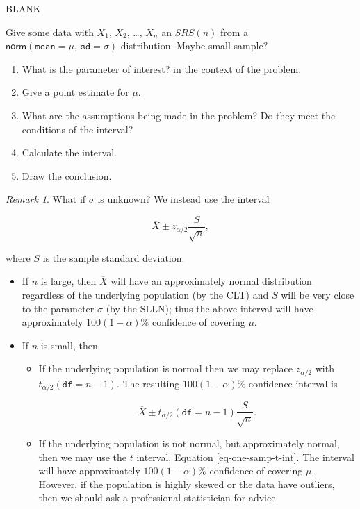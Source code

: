 \documentclass[]{book}
\providecommand{\tightlist}{%
  \setlength{\itemsep}{0pt}\setlength{\parskip}{0pt}}
\numberwithin{equation}{chapter}
\numberwithin{figure}{chapter}
\theoremstyle{plain}
\theoremstyle{definition}
\theoremstyle{remark}
\theoremstyle{definition}
\theoremstyle{definition}
\theoremstyle{remark}
\newtheorem*{remark}{Remark}
\let\BeginKnitrBlock\begin \let\EndKnitrBlock\end
\begin{document}
BLANK

\bigskip

\BeginKnitrBlock{example}
\protect\hypertarget{ex:unnamed-chunk-361}{}{\label{ex:unnamed-chunk-361}}Give
some data with \(X_{1}\), \(X_{2}\), \ldots{}, \(X_{n}\) an \(SRS(n)\)
from a \(\mathsf{norm}(\mathtt{mean}=\mu,\,\mathtt{sd}=\sigma)\)
distribution. Maybe small sample?
\EndKnitrBlock{example}

\begin{enumerate}
\def\labelenumi{\arabic{enumi}.}
\tightlist
\item
  What is the parameter of interest? in the context of the problem.
\item
  Give a point estimate for \(\mu\).
\item
  What are the assumptions being made in the problem? Do they meet the
  conditions of the interval?
\item
  Calculate the interval.
\item
  Draw the conclusion.
\end{enumerate}

\bigskip

\begin{remark}
What if \(\sigma\) is unknown? We instead use the interval

\begin{equation}
\overline{X}\pm z_{\alpha/2}\frac{S}{\sqrt{n}},
\end{equation}

where \(S\) is the sample standard deviation.

\begin{itemize}
\tightlist
\item
  If \(n\) is large, then \(\overline{X}\) will have an approximately
  normal distribution regardless of the underlying population (by the
  CLT) and \(S\) will be very close to the parameter \(\sigma\) (by the
  SLLN); thus the above interval will have approximately
  \(100(1-\alpha)\%\) confidence of covering \(\mu\).
\item
  If \(n\) is small, then

  \begin{itemize}
  \tightlist
  \item
    If the underlying population is normal then we may replace
    \(z_{\alpha/2}\) with \(t_{\alpha/2}(\mathtt{df}=n-1)\). The
    resulting \(100(1-\alpha)\%\) confidence interval is

    \begin{equation}
      \label{eq-one-samp-t-int}
      \overline{X}\pm t_{\alpha/2}(\mathtt{df}=n-1)\frac{S}{\sqrt{n}}.
      \end{equation}
  \item
    If the underlying population is not normal, but approximately
    normal, then we may use the \(t\) interval, Equation
    \eqref{eq-one-samp-t-int}. The interval will have approximately
    \(100(1-\alpha)\%\) confidence of covering \(\mu\). However, if the
    population is highly skewed or the data have outliers, then we
    should ask a professional statistician for advice.
  \end{itemize}
\end{itemize}
\end{remark}
\end{document}
